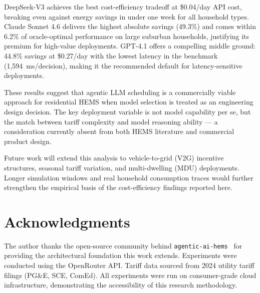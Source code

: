 \documentclass[conference]{IEEEtran}
\begin{document}
DeepSeek-V3 achieves the best cost-efficiency tradeoff at \$0.04/day
API cost, breaking even against energy savings in under one week for
all household types.
Claude Sonnet 4.6 delivers the highest absolute savings (49.3\%) and
comes within 6.2\% of oracle-optimal performance on large suburban
households, justifying its premium for high-value deployments.
GPT-4.1 offers a compelling middle ground: 44.8\% savings at
\$0.27/day with the lowest latency in the benchmark (1,594~ms/decision),
making it the recommended default for latency-sensitive deployments.

These results suggest that agentic LLM scheduling is a commercially
viable approach for residential HEMS when model selection is treated
as an engineering design decision.
The key deployment variable is not model capability per se, but the
match between tariff complexity and model reasoning ability --- a
consideration currently absent from both HEMS literature and commercial
product design.

Future work will extend this analysis to vehicle-to-grid (V2G) incentive
structures, seasonal tariff variation, and multi-dwelling (MDU) deployments.
Longer simulation windows and real household consumption traces would
further strengthen the empirical basis of the cost-efficiency findings
reported here.

\section*{Acknowledgments}
The author thanks the open-source community behind
\texttt{agentic-ai-hems}~\cite{makroum2025agentic} for providing the
architectural foundation this work extends.
Experiments were conducted using the OpenRouter API.
Tariff data sourced from 2024 utility tariff filings (PG\&E, SCE, ComEd).
All experiments were run on consumer-grade cloud infrastructure, demonstrating the accessibility of this research methodology.
\end{document}

